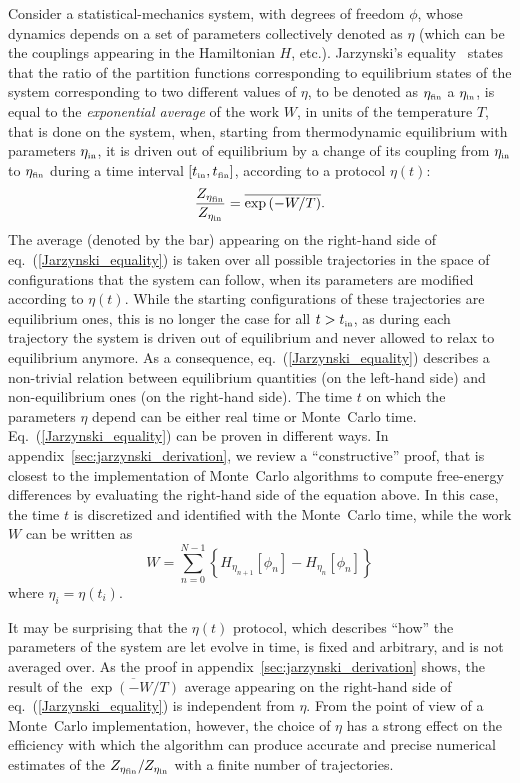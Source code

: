 \documentclass[11pt]{article}
\newcommand{\etain}{\eta_{\mbox{\tiny{in}}}}
\newcommand{\etafin}{\eta_{\mbox{\tiny{fin}}}}
\newcommand{\tin}{t_{\mbox{\tiny{in}}}}
\newcommand{\tfin}{t_{\mbox{\tiny{fin}}}}
\begin{document}
Consider a statistical-mechanics system, with degrees of freedom $\phi$, whose dynamics depends on a set of parameters collectively denoted as $\eta$ (which can be the couplings appearing in the Hamiltonian $H$, etc.). Jarzynski's equality~\cite{Jarzynski:1996oqb, Jarzynski:1997ef} states that the ratio of the partition functions corresponding to equilibrium states of the system corresponding to two different values of $\eta$, to be denoted as $\etafin$ a $\etain$, is equal to the \emph{exponential average} of the work $W$, in units of the temperature $T$, that is done on the system, when, starting from thermodynamic equilibrium with parameters $\etain$, it is driven out of equilibrium by a change of its coupling from $\etain$ to $\etafin$ during a time interval $[\tin, \tfin]$, according to a protocol $\eta(t)$:
\begin{equation}
\label{Jarzynski_equality}
\frac{Z_{\etafin}}{Z_{\etain}} = \overline{\exp \left( -W/T \right)}.
\end{equation}
The average (denoted by the bar) appearing on the right-hand side of eq.~(\ref{Jarzynski_equality}) is taken over all possible trajectories in the space of configurations that the system can follow, when its parameters are modified according to $\eta(t)$. While the starting configurations of these trajectories are equilibrium ones, this is no longer the case for all $t>\tin$, as during each trajectory the system is driven out of equilibrium and never allowed to relax to equilibrium anymore. As a consequence, eq.~(\ref{Jarzynski_equality}) describes a non-trivial relation between equilibrium quantities (on the left-hand side) and non-equilibrium ones (on the right-hand side). The time $t$ on which the parameters $\eta$ depend can be either real time or Monte~Carlo time. Eq.~(\ref{Jarzynski_equality}) can be proven in different ways. In appendix~\ref{sec:jarzynski_derivation}, we review a ``constructive'' proof, that is closest to the implementation of Monte~Carlo algorithms to compute free-energy differences by evaluating the right-hand side of the equation above. In this case, the time $t$ is discretized and identified with the Monte~Carlo time, while the work $W$ can be written as
\begin{equation}
 W = \sum_{n=0}^{N-1} \left\{ H_{\eta_{n+1}}\left[\phi_n\right] - H_{\eta_n}\left[\phi_n\right] \right\}
\end{equation}
where $\eta_i = \eta(t_i)$.

It may be surprising that the $\eta(t)$ protocol, which describes ``how'' the parameters of the system are let evolve in time, is fixed and arbitrary, and is not averaged over. As the proof in appendix~\ref{sec:jarzynski_derivation} shows, the result of the $\overline{\exp \left( -W/T \right)}$ average appearing on the right-hand side of eq.~(\ref{Jarzynski_equality}) is independent from $\eta$. From the point of view of a Monte~Carlo implementation, however, the choice of $\eta$ has a strong effect on the efficiency with which the algorithm can produce accurate and precise numerical estimates of the $Z_{\etafin}/Z_{\etain}$ with a finite number of trajectories.
\end{document}
